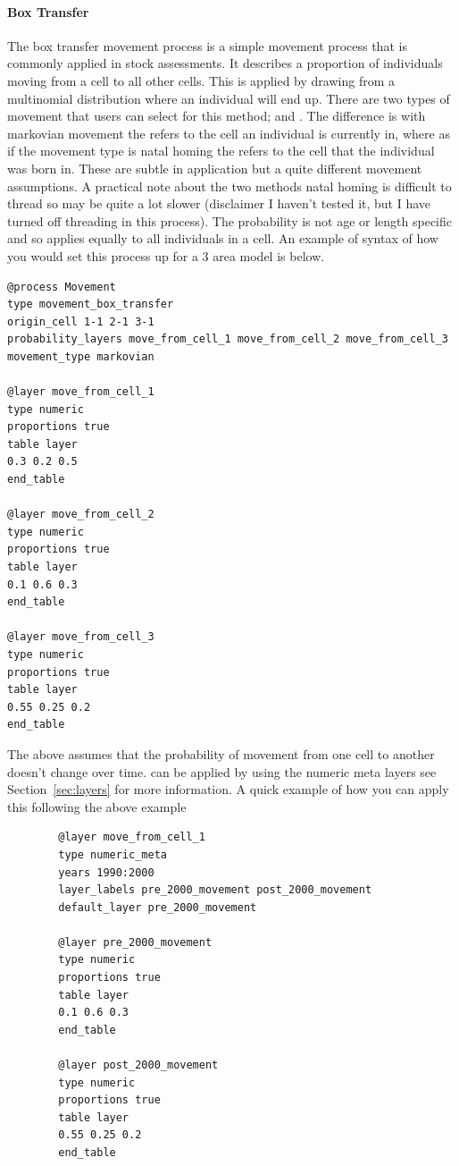 \paragraph{Box Transfer}\label{subsubsec:box_transfer}
The box transfer movement process is a simple movement process that is commonly applied in stock assessments. It describes a proportion of individuals moving from a cell to all other cells. This is applied by drawing from a multinomial distribution where an individual will end up. There are two types of movement that users can select for this method;  and . The difference is with markovian movement the  refers to the cell an individual is currently in, where as if the movement type is natal homing the  refers to the cell that the individual was born in. These are subtle in application but a quite different movement assumptions. A practical note about the two methods natal homing is difficult to thread so may be quite a lot slower (disclaimer I haven't tested it, but I have turned off threading in this process). The probability is not age or length specific and so applies equally to all individuals in a cell. An example of syntax of how you would set this process up for a 3 area model is below.


{\small{\begin{verbatim}
@process Movement
type movement_box_transfer
origin_cell 1-1 2-1 3-1
probability_layers move_from_cell_1 move_from_cell_2 move_from_cell_3
movement_type markovian

@layer move_from_cell_1
type numeric
proportions true
table layer
0.3 0.2 0.5
end_table

@layer move_from_cell_2
type numeric
proportions true
table layer
0.1 0.6 0.3
end_table

@layer move_from_cell_3
type numeric
proportions true
table layer
0.55 0.25 0.2
end_table

\end{verbatim}}}

The above assumes that the probability of movement from one cell to another doesn't change over time.  can be applied by using the numeric meta layers see Section~\ref{sec:layers} for more information. A quick example of how you can apply this following the above example

{\small{\begin{verbatim}
		@layer move_from_cell_1
		type numeric_meta
		years 1990:2000
		layer_labels pre_2000_movement post_2000_movement
		default_layer pre_2000_movement
		
		@layer pre_2000_movement
		type numeric
		proportions true
		table layer
		0.1 0.6 0.3
		end_table
		
		@layer post_2000_movement
		type numeric
		proportions true
		table layer
		0.55 0.25 0.2
		end_table
		\end{verbatim}}}


